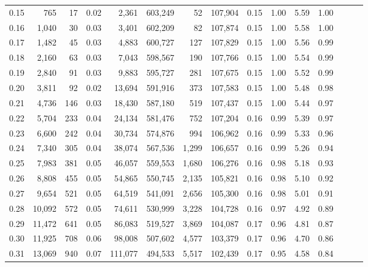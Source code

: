 \begin{tabular}{rrrrrrrrrrrrrrr}
0.15 &     765 &     17 &  0.02 &    2,361 &  603,249 &       52 &  107,904 &  0.15 &  1.00 &  5.59 &      1.00 \\
0.16 &   1,040 &     30 &  0.03 &    3,401 &  602,209 &       82 &  107,874 &  0.15 &  1.00 &  5.58 &      1.00 \\
0.17 &   1,482 &     45 &  0.03 &    4,883 &  600,727 &      127 &  107,829 &  0.15 &  1.00 &  5.56 &      0.99 \\
0.18 &   2,160 &     63 &  0.03 &    7,043 &  598,567 &      190 &  107,766 &  0.15 &  1.00 &  5.54 &      0.99 \\
0.19 &   2,840 &     91 &  0.03 &    9,883 &  595,727 &      281 &  107,675 &  0.15 &  1.00 &  5.52 &      0.99 \\
0.20 &   3,811 &     92 &  0.02 &   13,694 &  591,916 &      373 &  107,583 &  0.15 &  1.00 &  5.48 &      0.98 \\
0.21 &   4,736 &    146 &  0.03 &   18,430 &  587,180 &      519 &  107,437 &  0.15 &  1.00 &  5.44 &      0.97 \\
0.22 &   5,704 &    233 &  0.04 &   24,134 &  581,476 &      752 &  107,204 &  0.16 &  0.99 &  5.39 &      0.97 \\
0.23 &   6,600 &    242 &  0.04 &   30,734 &  574,876 &      994 &  106,962 &  0.16 &  0.99 &  5.33 &      0.96 \\
0.24 &   7,340 &    305 &  0.04 &   38,074 &  567,536 &    1,299 &  106,657 &  0.16 &  0.99 &  5.26 &      0.94 \\
0.25 &   7,983 &    381 &  0.05 &   46,057 &  559,553 &    1,680 &  106,276 &  0.16 &  0.98 &  5.18 &      0.93 \\
0.26 &   8,808 &    455 &  0.05 &   54,865 &  550,745 &    2,135 &  105,821 &  0.16 &  0.98 &  5.10 &      0.92 \\
0.27 &   9,654 &    521 &  0.05 &   64,519 &  541,091 &    2,656 &  105,300 &  0.16 &  0.98 &  5.01 &      0.91 \\
0.28 &  10,092 &    572 &  0.05 &   74,611 &  530,999 &    3,228 &  104,728 &  0.16 &  0.97 &  4.92 &      0.89 \\
0.29 &  11,472 &    641 &  0.05 &   86,083 &  519,527 &    3,869 &  104,087 &  0.17 &  0.96 &  4.81 &      0.87 \\
0.30 &  11,925 &    708 &  0.06 &   98,008 &  507,602 &    4,577 &  103,379 &  0.17 &  0.96 &  4.70 &      0.86 \\
0.31 &  13,069 &    940 &  0.07 &  111,077 &  494,533 &    5,517 &  102,439 &  0.17 &  0.95 &  4.58 &      0.84 \\

\end{tabular}
